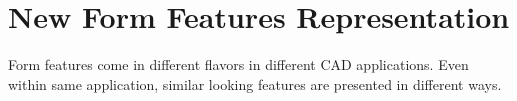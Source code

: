 \newcommand{\loft}[5]{\ensuremath{\textcolor{magenta}{\Omega{\bf \mathcal{L}}_{#1}^{#2,#3}}\textcolor{blue}{[\{#4\} (#5)]}}}
\newcommand{\affine}[5]{\ensuremath{\textcolor{cyan}{\Delta{\bf \mathcal{A}}_{#1}^{#2,#3}} \textcolor{blue}{[\{#4\} (#5)]}}}
\newcommand{\boolop}[5]{\ensuremath{\textcolor{green}{\Omega{\bf \mathcal{B}}_{#1}^{#2,#3}}\textcolor{blue}{[\{#4\} (#5)]}}}
\newcommand{\generic}[7]{\ensuremath{\textcolor{red}{#1{\bf \mathcal{#2}}_{#3}^{#4,#5}}\textcolor{blue}{[\{#6\} (#7)]}}}


\section{New Form Features Representation}

Form features come in different flavors in different CAD applications. Even within same application, similar looking features are presented in different ways.

